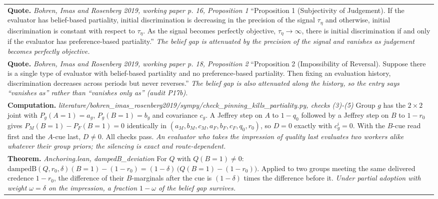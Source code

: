 \documentclass[10pt]{article}
\theoremstyle{definition}
\newlength{\fullw}\setlength{\fullw}{25.9cm}
\begin{document}
{\begin{longtable}{|p{0.9cm}|p{12.2cm}|p{12.2cm}|}
\multicolumn{3}{|p{\fullw}|}{\textbf{Quote.} \textit{Bohren, Imas and Rosenberg 2019, working paper p. 16, Proposition 1} \newline ``Proposition 1 (Subjectivity of Judgement). If the evaluator has belief-based partiality, initial discrimination is decreasing in the precision of the signal $\tau_\eta$ and otherwise, initial discrimination is constant with respect to $\tau_\eta$. As the signal becomes perfectly objective, $\tau_\eta \to \infty$, there is initial discrimination if and only if the evaluator has preference-based partiality.'' \newline \textit{The belief gap is attenuated by the precision of the signal and vanishes as judgement becomes perfectly objective.}} \\
\multicolumn{3}{|p{\fullw}|}{\textbf{Quote.} \textit{Bohren, Imas and Rosenberg 2019, working paper p. 18, Proposition 2} \newline ``Proposition 2 (Impossibility of Reversal). Suppose there is a single type of evaluator with belief-based partiality and no preference-based partiality. Then fixing an evaluation history, discrimination decreases across periods but never reverses.'' \newline \textit{The belief gap is also attenuated along the history, so the entry says ``vanishes as'' rather than ``vanishes only as'' (audit P17b).}} \\
\multicolumn{3}{|p{\fullw}|}{\textbf{Computation.} \textit{literature/bohren\_imas\_rosenberg2019/sympy/check\_pinning\_kills\_partiality.py, checks (3)-(5)} \newline Group $g$ has the $2{\times}2$ joint with $P_g(A{=}1) = a_g$, $P_g(B{=}1) = b_g$ and covariance $c_g$. A Jeffrey step on $A$ to $1-q_0$ followed by a Jeffrey step on $B$ to $1-r_0$ gives $P_M(B{=}1) - P_F(B{=}1) = 0$ identically in $(a_M,b_M,c_M,a_F,b_F,c_F,q_0,r_0)$, so $D = 0$ exactly with $c^i_g = 0$. With the $B$-cue read first and the $A$-cue last, $D \neq 0$. All checks pass. \newline \textit{An evaluator who takes the impression of quality last evaluates two workers alike whatever their group priors; the silencing is exact and route-dependent.}} \\
\multicolumn{3}{|p{\fullw}|}{\textbf{Theorem.} \textit{Anchoring.lean, dampedB\_deviation} \newline For $Q$ with $Q(B{=}1) \neq 0$: $\mathrm{dampedB}(Q,r_0,\delta)(B{=}1) - (1-r_0) = (1-\delta)\,\big(Q(B{=}1) - (1-r_0)\big)$. Applied to two groups meeting the same delivered credence $1-r_0$, the difference of their $B$-marginals after the cue is $(1-\delta)$ times the difference before it. \newline \textit{Under partial adoption with weight $\omega = \delta$ on the impression, a fraction $1-\omega$ of the belief gap survives.}} \\

\end{longtable}}
\end{document}
